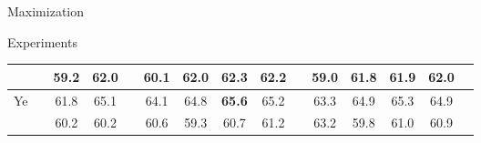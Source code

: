 \documentclass[12pt]{beamer}
\begin{document}
\begin{frame}{Maximization}
\begin{block}{Experiments}
\begin{table}
\begin{tabular}{l@{\ }c*{13}{c}}
				\multicolumn{1}{l}{}                    & \Fm                    & 59.2       & 62.0                   &    & 60.1                   & 62.0        & 62.3                        & 62.2          &    & 59.0       & 61.8        & 61.9                        & 62.0          \\
				\hline
				\multicolumn{1}{l}{\multirow{2}{*}{Ye}} & \Cm                    & 61.8       & 65.1                   &    & 64.1                   & 64.8        & \textbf{65.6}               & 65.2          &    & 63.3       & 64.9        & 65.3                        & 64.9          \\
				\multicolumn{1}{l}{}                    & \Fm                    & 60.2       & 60.2                   &    & 60.6                   & 59.3        & 60.7                        & 61.2          &    & 63.2       & 59.8        & 61.0                        & 60.9          \\
				\bottomrule
			\end{tabular}
		\end{table}
	\end{block}
\end{frame}
\end{document}
